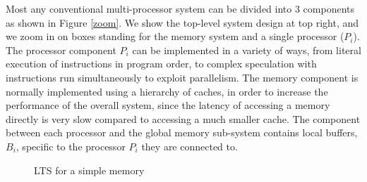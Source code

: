 %
%
%
%
%

Most any conventional multi-processor system can be divided into 3 components as shown in
Figure \ref{zoom}. 
We show the top-level system design at top right, and we zoom in on boxes standing for the
memory system and a single processor ($P_i$).
The processor component $P_i$ can be implemented in a
variety of ways, from literal execution of instructions in program order, to complex speculation
with instructions run simultaneously to exploit parallelism. The memory component is normally implemented
using a hierarchy of caches, in order to increase the performance of the
overall system, since the latency of accessing a memory directly is very slow
compared to accessing a much smaller cache. The component between each
processor and the global memory sub-system contains local buffers, $B_i$, specific to
the processor $P_i$ they are connected to. 

\begin{figure}
\small
\centering
\begin{boxedminipage}[c]{.48\textwidth}
\inference
[Load]
{}
{}

\inference
[Store]
{}
{}

\end{boxedminipage}
\caption{LTS for a simple memory}
\label{$M_m$}
\end{figure}

